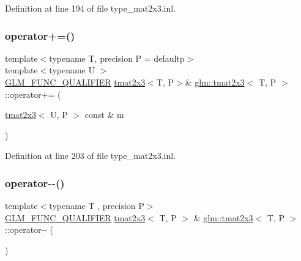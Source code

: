 Definition at line 194 of file type\+\_\+mat2x3.\+inl.

\mbox{\label{structglm_1_1tmat2x3_aeedada1605cb25ac7e5e22b09c85df08}} 
\subsubsection{\texorpdfstring{operator+=()}{operator+=()}\hspace{0.1cm}{\footnotesize\ttfamily [4/4]}}
{\footnotesize\ttfamily template$<$typename T, precision P = defaultp$>$ \\
template$<$typename U $>$ \\
\mbox{\hyperlink{setup_8hpp_a33fdea6f91c5f834105f7415e2a64407}{G\+L\+M\+\_\+\+F\+U\+N\+C\+\_\+\+Q\+U\+A\+L\+I\+F\+I\+ER}} \mbox{\hyperlink{structglm_1_1tmat2x3}{tmat2x3}}$<$T, P$>$\& \mbox{\hyperlink{structglm_1_1tmat2x3}{glm\+::tmat2x3}}$<$ T, P $>$\+::operator+= (\begin{DoxyParamCaption}\item[{\mbox{\hyperlink{structglm_1_1tmat2x3}{tmat2x3}}$<$ U, P $>$ const \&}]{m }\end{DoxyParamCaption})}



Definition at line 203 of file type\+\_\+mat2x3.\+inl.

\mbox{\label{structglm_1_1tmat2x3_a5d7a0f908e4ac53b0caad27168cf9d12}} 
\subsubsection{\texorpdfstring{operator-\/-\/()}{operator--()}\hspace{0.1cm}{\footnotesize\ttfamily [1/2]}}
{\footnotesize\ttfamily template$<$typename T , precision P$>$ \\
\mbox{\hyperlink{setup_8hpp_a33fdea6f91c5f834105f7415e2a64407}{G\+L\+M\+\_\+\+F\+U\+N\+C\+\_\+\+Q\+U\+A\+L\+I\+F\+I\+ER}} \mbox{\hyperlink{structglm_1_1tmat2x3}{tmat2x3}}$<$ T, P $>$ \& \mbox{\hyperlink{structglm_1_1tmat2x3}{glm\+::tmat2x3}}$<$ T, P $>$\+::operator-\/-\/ (\begin{DoxyParamCaption}{ }\end{DoxyParamCaption})}



